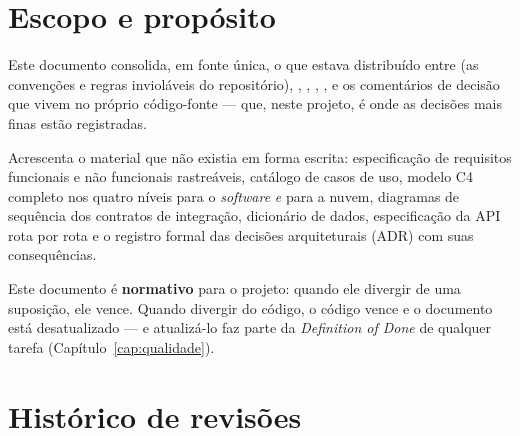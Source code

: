 \section*{Escopo e propósito}

Este documento consolida, em fonte única, o que estava distribuído entre
 (as convenções e regras invioláveis do repositório),
, , ,
,  e os comentários de decisão
que vivem no próprio código-fonte --- que, neste projeto, é onde as decisões
mais finas estão registradas.

Acrescenta o material que não existia em forma escrita: especificação de
requisitos funcionais e não funcionais rastreáveis, catálogo de casos de uso,
modelo C4 completo nos quatro níveis para o \textit{software} \emph{e} para a
nuvem, diagramas de sequência dos contratos de integração, dicionário de dados,
especificação da API rota por rota e o registro formal das decisões
arquiteturais (ADR) com suas consequências.

\begin{nota}
Este documento é \textbf{normativo} para o projeto: quando ele divergir de uma
suposição, ele vence. Quando divergir do código, o código vence e o documento
está desatualizado --- e atualizá-lo faz parte da \emph{Definition of Done} de
qualquer tarefa (Capítulo~\ref{cap:qualidade}).
\end{nota}

\section*{Histórico de revisões}

